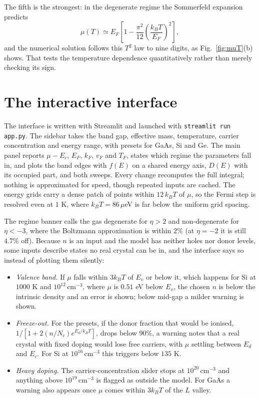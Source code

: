 \documentclass[aps,prb,reprint,nofootinbib]{revtex4-2}
\begin{document}
The fifth is the strongest: in the degenerate regime the Sommerfeld expansion predicts
\begin{equation}
  \mu(T) \simeq E_F\left[1-\frac{\pi^2}{12}\left(\frac{k_BT}{E_F}\right)^{2}\right],
  \label{eq:somm}
\end{equation}
and the numerical solution follows this $T^2$ law to nine digits, as
Fig.~\ref{fig:muT}(b) shows. That tests the temperature dependence quantitatively rather than
merely checking its sign.

\section{The interactive interface}

The interface is written with Streamlit and launched with \texttt{streamlit run app.py}. The
sidebar takes the band gap, effective mass, temperature, carrier concentration and energy range,
with presets for GaAs, Si and Ge. The main panel reports $\mu-E_c$, $E_F$, $k_F$, $v_F$ and
$T_F$, states which regime the parameters fall in, and plots the band edges with $f(E)$ on a
shared energy axis, $D(E)$ with its occupied part, and both sweeps. Every change recomputes the
full integral; nothing is approximated for speed, though repeated inputs are cached. The energy
grids carry a dense patch of points within $12\,k_BT$ of $\mu$, so the Fermi step is resolved
even at $1$ K, where $k_BT=86\,\mu$eV is far below the uniform grid spacing.

The regime banner calls the gas degenerate for $\eta>2$ and non-degenerate for $\eta<-3$, where
the Boltzmann approximation is within $2\%$ (at $\eta=-2$ it is still $4.7\%$ off). Because $n$
is an input and the model has neither holes nor donor levels, some inputs describe states no real
crystal can be in, and the interface says so instead of plotting them silently:
\begin{itemize}
  \item \emph{Valence band.} If $\mu$ falls within $3k_BT$ of $E_v$ or below it, which happens
        for Si at $1000$ K and $10^{12}\,$cm$^{-3}$, where $\mu$ is $0.51$ eV below $E_v$, the
        chosen $n$ is below the intrinsic density and an error is shown; below mid-gap a
        milder warning is shown.
  \item \emph{Freeze-out.} For the presets, if the donor fraction that would be ionised,
        $1/[1+2(n/N_c)e^{E_d/k_BT}]$, drops below $90\%$, a warning notes that a real crystal
        with fixed doping would lose free carriers, with $\mu$ settling between $E_d$ and $E_c$.
        For Si at $10^{16}\,$cm$^{-3}$ this triggers below $135$ K.
  \item \emph{Heavy doping.} The carrier-concentration slider stops at $10^{20}\,$cm$^{-3}$ and
        anything above $10^{19}\,$cm$^{-3}$ is flagged as outside the model. For GaAs a warning
        also appears once $\mu$ comes within $3k_BT$ of the $L$ valley.
\end{itemize}
\end{document}
